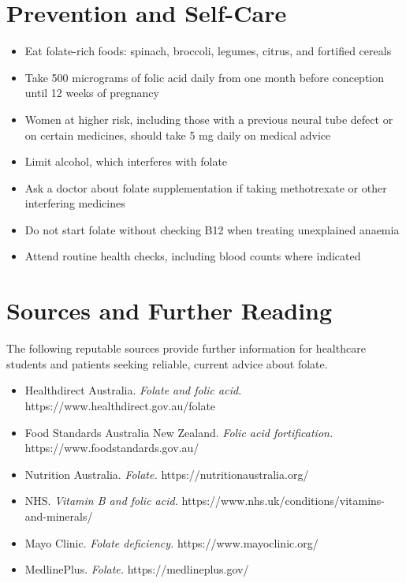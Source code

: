 \section*{Prevention and Self-Care}
\begin{itemize}
    \item Eat folate-rich foods: spinach, broccoli, legumes, citrus, and fortified cereals
    \item Take 500 micrograms of folic acid daily from one month before conception until 12 weeks of pregnancy
    \item Women at higher risk, including those with a previous neural tube defect or on certain medicines, should take 5 mg daily on medical advice
    \item Limit alcohol, which interferes with folate
    \item Ask a doctor about folate supplementation if taking methotrexate or other interfering medicines
    \item Do not start folate without checking B12 when treating unexplained anaemia
    \item Attend routine health checks, including blood counts where indicated
\end{itemize}

\section*{Sources and Further Reading}
The following reputable sources provide further information for healthcare students and patients seeking reliable, current advice about folate.
\begin{itemize}
    \item Healthdirect Australia. \textit{Folate and folic acid.} https://www.healthdirect.gov.au/folate
    \item Food Standards Australia New Zealand. \textit{Folic acid fortification.} https://www.foodstandards.gov.au/
    \item Nutrition Australia. \textit{Folate.} https://nutritionaustralia.org/
    \item NHS. \textit{Vitamin B and folic acid.} https://www.nhs.uk/conditions/vitamins-and-minerals/
    \item Mayo Clinic. \textit{Folate deficiency.} https://www.mayoclinic.org/
    \item MedlinePlus. \textit{Folate.} https://medlineplus.gov/
\end{itemize}
